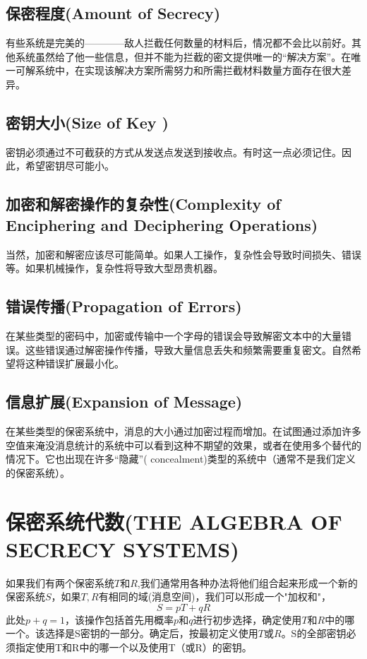\documentclass[]{article}
\begin{document}
\subsection{保密程度(Amount of Secrecy)}
有些系统是完美的————敌人拦截任何数量的材料后，情况都不会比以前好。其他系统虽然给了他一些信息，但并不能为拦截的密文提供唯一的“解决方案”。在唯一可解系统中，在实现该解决方案所需努力和所需拦截材料数量方面存在很大差异。

\subsection{密钥大小(Size of Key )}

密钥必须通过不可截获的方式从发送点发送到接收点。有时这一点必须记住。因此，希望密钥尽可能小。

\subsection{加密和解密操作的复杂性(Complexity of Enciphering and Deciphering Operations)}

当然，加密和解密应该尽可能简单。如果人工操作，复杂性会导致时间损失、错误等。如果机械操作，复杂性将导致大型昂贵机器。

\subsection{错误传播(Propagation of Errors)}

在某些类型的密码中，加密或传输中一个字母的错误会导致解密文本中的大量错误。这些错误通过解密操作传播，导致大量信息丢失和频繁需要重复密文。自然希望将这种错误扩展最小化。

\subsection{信息扩展(Expansion of Message)}
在某些类型的保密系统中，消息的大小通过加密过程而增加。在试图通过添加许多空值来淹没消息统计的系统中可以看到这种不期望的效果，或者在使用多个替代的情况下。它也出现在许多“隐藏”( concealment)类型的系统中（通常不是我们定义的保密系统）。

\section{保密系统代数(THE ALGEBRA OF SECRECY SYSTEMS)}
如果我们有两个保密系统$T$和$R$,我们通常用各种办法将他们组合起来形成一个新的保密系统$S$，如果$T,R$有相同的域(消息空间)，我们可以形成一个"加权和"，
\[S=pT+qR\]
此处$p+q=1$，该操作包括首先用概率$p$和$q$进行初步选择，确定使用$T$和$R$中的哪一个。该选择是S密钥的一部分。确定后，按最初定义使用$T$或$R$。S的全部密钥必须指定使用T和R中的哪一个以及使用T（或R）的密钥。
\end{document}
